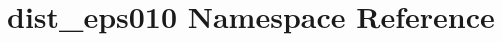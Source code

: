 \hypertarget{namespacedist__eps010}{}\section{dist\+\_\+eps010 Namespace Reference}
\label{namespacedist__eps010}
